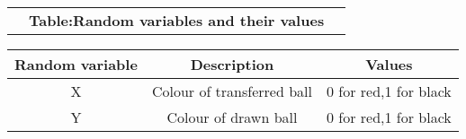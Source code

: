 \begin{center}
\begin{tabular}{ccc}
          &      \textbf{Table:Random variables and their values}		& \\
\end{tabular}
\begin{tabular}{|c|c|c|}
\hline
Random variable	&       Description	&           Values\\
\hline 
               X	&Colour of transferred ball	&        0 for red,1 for black\\
\hline           
               Y	&Colour of drawn ball	&        0 for red,1 for black\\
\hline 
\end{tabular}
\end{center}
